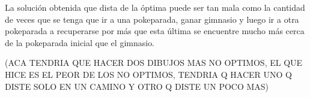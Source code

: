 La soluci\'on obtenida que dista de la \'optima puede ser tan mala como la cantidad de veces que se tenga que ir a una pokeparada, ganar gimnasio y luego ir a otra pokeparada a recuperarse por m\'as que esta \'ultima se encuentre mucho m\'as cerca de la pokeparada inicial que el gimnasio.

(ACA TENDRIA QUE HACER DOS DIBUJOS MAS NO OPTIMOS, EL QUE HICE ES EL PEOR DE LOS NO OPTIMOS, TENDRIA Q HACER UNO Q DISTE SOLO EN UN CAMINO Y OTRO Q DISTE UN POCO MAS)